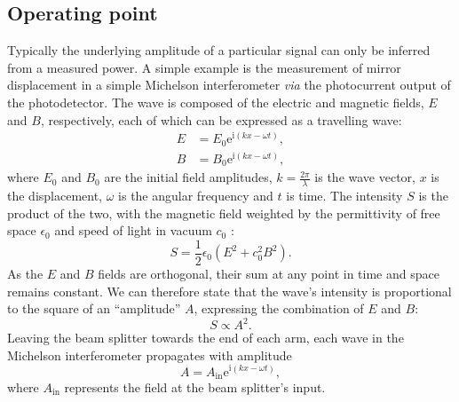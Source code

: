 \subsection{\label{sec:operating-point}Operating point}
Typically the underlying amplitude of a particular signal can only be inferred from a measured power. A simple example is the measurement of mirror displacement in a simple Michelson interferometer \emph{via} the photocurrent output of the photodetector. The wave is composed of the electric and magnetic fields, $E$ and $B$, respectively, each of which can be expressed as a travelling wave:
\begin{align}
  E &= E_0 \text{e}^{\text{i} \left( kx - \omega t \right)}, \\
  B &= B_0 \text{e}^{\text{i}  \left( kx - \omega t \right)},
\end{align}
where $E_0$ and $B_0$ are the initial field amplitudes, $k = \frac{2 \pi}{\lambda}$ is the wave vector, $x$ is the displacement, $\omega$ is the angular frequency and $t$ is time. The intensity $S$ is the product of the two, with the magnetic field weighted by the permittivity of free space $\epsilon_0$ and speed of light in vacuum $c_0$ :
\begin{equation}
  S = \frac{1}{2} \epsilon_0 \left( E^2 + c_0^2 B^2 \right).
\end{equation}
As the $E$ and $B$ fields are orthogonal, their sum at any point in time and space remains constant. We can therefore state that the wave's intensity is proportional to the square of an ``amplitude'' $A$, expressing the combination of $E$ and $B$:
\begin{equation}
  S \propto A^2.
\end{equation}
Leaving the beam splitter towards the end of each arm, each wave in the Michelson interferometer propagates with amplitude
\begin{equation}
  A = A_{\text{in}} \text{e}^{\text{i} \left( kx - \omega t \right)},
\end{equation}
where $A_{\text{in}}$ represents the field at the beam splitter's input.

